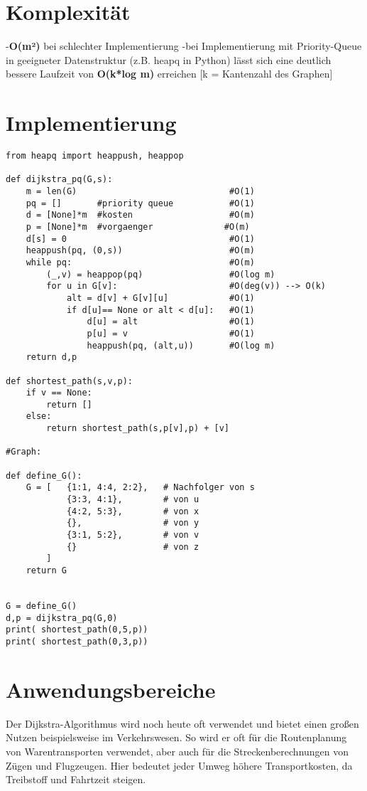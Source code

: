 \section{Komplexität}

-\textbf{O(m²) }bei schlechter Implementierung
-bei Implementierung mit Priority-Queue in geeigneter Datenstruktur (z.B. heapq in Python) lässt sich  eine deutlich bessere Laufzeit von \textbf{O(k*log m)} erreichen [k = Kantenzahl des Graphen]

\section{Implementierung}

\lstset{language=Python}
\begin{lstlisting}
from heapq import heappush, heappop

def dijkstra_pq(G,s):
    m = len(G)                              #O(1)
    pq = []       #priority queue           #O(1)
    d = [None]*m  #kosten                   #O(m)
    p = [None]*m  #vorgaenger		       #O(m)
    d[s] = 0                                #O(1)
    heappush(pq, (0,s))                     #O(m)
    while pq:                               #O(m)
        (_,v) = heappop(pq)                 #O(log m)
        for u in G[v]:                      #O(deg(v)) --> O(k)  
            alt = d[v] + G[v][u]            #O(1)
            if d[u]== None or alt < d[u]:   #O(1)
                d[u] = alt		            #O(1)	
               	p[u] = v                    #O(1)
                heappush(pq, (alt,u))       #O(log m)        
    return d,p

def shortest_path(s,v,p):
	if v == None:
		return []
	else:
		return shortest_path(s,p[v],p) + [v]
 
#Graph: 
    
def define_G():
    G = [   {1:1, 4:4, 2:2},   # Nachfolger von s
            {3:3, 4:1},        # von u
            {4:2, 5:3},        # von x
            {},                # von y
            {3:1, 5:2},        # von v
            {}                 # von z
        ]
    return G


G = define_G()
d,p = dijkstra_pq(G,0)
print( shortest_path(0,5,p))
print( shortest_path(0,3,p))
\end{lstlisting}

\section{Anwendungsbereiche}
Der Dijkstra-Algorithmus wird noch heute oft verwendet und bietet einen großen Nutzen beispielsweise im Verkehrswesen.
So wird er oft für die Routenplanung von Warentransporten verwendet, aber auch für die Streckenberechnungen von Zügen und Flugzeugen.
Hier bedeutet jeder Umweg höhere Transportkosten, da Treibstoff und Fahrtzeit steigen.

